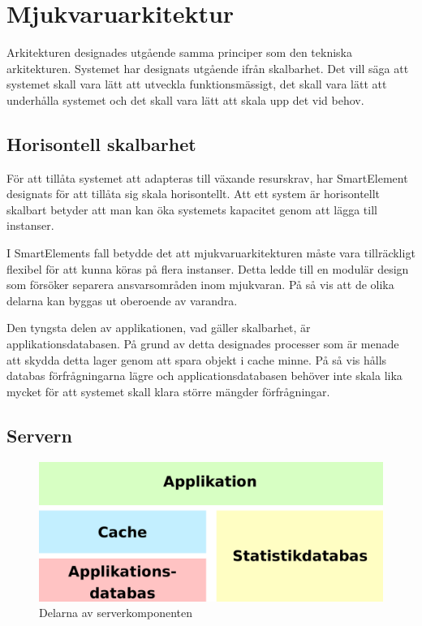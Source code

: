 \section{Mjukvaruarkitektur}

Arkitekturen designades utgående samma principer som den tekniska arkitekturen. Systemet har designats utgående ifrån skalbarhet. Det vill säga att systemet skall vara lätt att utveckla funktionsmässigt, det skall vara lätt att underhålla systemet och det skall vara lätt att skala upp det vid behov. \citep[s. 203]{scalableweb}

\subsection{Horisontell skalbarhet}

För att tillåta systemet att adapteras till växande resurskrav, har SmartElement designats för att tillåta sig skala horisontellt. Att ett system är horisontellt skalbart betyder att man kan öka systemets kapacitet genom att lägga till instanser.\citep[s. 205-207]{scalableweb}

I SmartElements fall betydde det att mjukvaruarkitekturen måste vara tillräckligt flexibel för att kunna köras på flera instanser. Detta ledde till en modulär design som försöker separera ansvarsområden inom mjukvaran. På så vis att de olika delarna kan byggas ut oberoende av varandra.

Den tyngsta delen av applikationen, vad gäller skalbarhet, är applikationsdatabasen. På grund av detta designades processer som är menade att skydda detta lager genom att spara objekt i cache minne. På så vis hålls databas förfrågningarna lägre och applicationsdatabasen behöver inte skala lika mycket för att systemet skall klara större mängder förfrågningar.

\subsection{Servern}

\begin{figure}[h!]
\centering
\includegraphics[width=120mm]{assets/images/smelementbackendparts.png}
\caption{Delarna av serverkomponenten}
\label{abstractbackend}
\end{figure}

